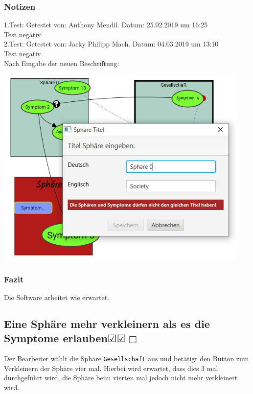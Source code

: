 \documentclass[enabledeprecatedfontcommands]{scrartcl}
\newcommand{\subsectiont}[2]{\subsection[#1]{#1{\normalsize\normalfont #2}}}
\newcommand{\leer}{$\Box$}
\newcommand{\ok}{$\CheckedBox$}
\begin{document}
\subsubsection{Notizen}
1.Test: Getestet von: Anthony Mendil. Datum: 25.02.2019 um 16:25 \\
Test negativ. \\
2.Test: Getestet von: Jacky Philipp Mach. Datum: 04.03.2019 um 13:10 \\
Test negativ.\\
Nach Eingabe der neuen Beschriftung: 
\begin{center}
\includegraphics[height=10cm]{3_50.PNG}
\end{center}
\subsubsection{Fazit}
Die Software arbeitet wie erwartet.

\subsectiont{Eine Sphäre mehr verkleinern als es die Symptome erlauben}{\dotfill\ok\ok\leer}
Der Bearbeiter wählt die Sphäre \texttt{Gesellschaft} aus und betätigt den Button zum Verkleinern der Sphäre vier mal. Hierbei wird erwartet, dass dies 3 mal durchgeführt wird, die Sphäre beim vierten mal jedoch nicht mehr verkleinert wird. 
\end{document}
